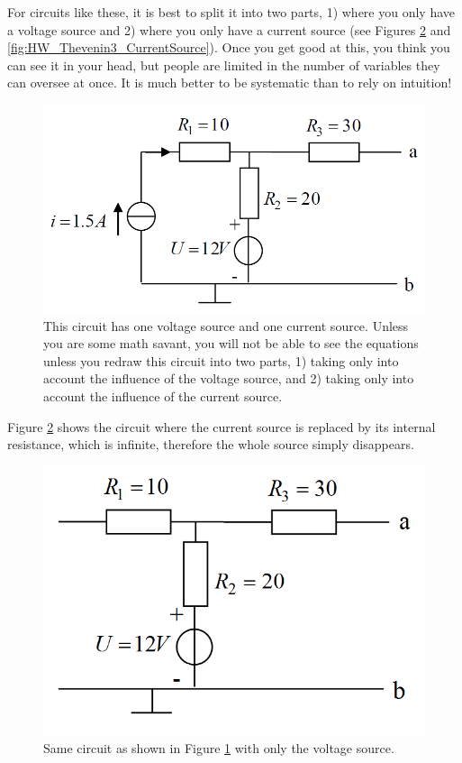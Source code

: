 \documentclass[11pt,letterpaper]{article}
\begin{document}
For circuits like these, it is best to split it into two parts, 1) where you only have a voltage source and 2) where you only have a current source (see Figures \ref{fig:HW_Thevenin3_VoltageSource} and \ref{fig:HW_Thevenin3_CurrentSource}). Once you get good at this, you think you can see it in your head, but people are limited in the number of variables they can oversee at once. It is much better to be systematic than to rely on intuition!\\


\begin{figure}
\centering
\includegraphics[width=0.65\linewidth]{HW_Thevenin3}
\caption{This circuit has one voltage source and one current source. Unless you are some math savant, you will not be able to see the equations unless you redraw this circuit into two parts, 1) taking only into account the influence of the voltage source, and 2) taking only into account the influence of the current source.}
\label{fig:HW_Thevenin3}
\end{figure}

Figure \ref{fig:HW_Thevenin3_VoltageSource} shows the circuit where the current source is replaced by its internal resistance, which is infinite, therefore the whole source simply disappears.\\
\begin{figure}
\centering
\includegraphics[width=0.5\linewidth]{HW_Thevenin3_VoltageSource}
\caption{Same circuit as shown in Figure \ref{fig:HW_Thevenin3} with only the voltage source.}
\label{fig:HW_Thevenin3_VoltageSource}
\end{figure}
\end{document}
